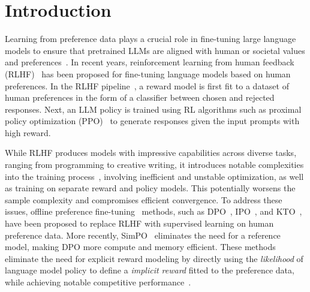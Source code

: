 \section{Introduction}
Learning from preference data plays a crucial role in fine-tuning large language models to ensure that pretrained LLMs are aligned with human or societal values and preferences~\citep{bai2022training,ouyang2022training,stiennon2020learning}. In recent years, reinforcement learning from human feedback (RLHF)~\citep{ouyang2022training,christiano2017deep} has been proposed for fine-tuning language models based on human preferences. In the RLHF pipeline~\citep{ouyang2022training}, a reward model is first fit to a dataset of human preferences in the form of a classifier between chosen and rejected responses. Next, an LLM policy is trained using RL algorithms such as proximal policy optimization (PPO)~\citep{schulman2017proximal} to generate responses given the input prompts with high reward.

While RLHF produces models with impressive capabilities across diverse tasks, ranging from programming to creative writing, it introduces notable complexities into the training process~\citep{engstrom2020implementation,rafailov2024direct}, involving inefficient and unstable optimization, as well as training on separate reward and policy models. This potentially worsens the sample complexity and compromises efficient convergence. To address these issues, offline  preference fine-tuning~\citep{tajwar2024preference} methods, such as DPO~\citep{rafailov2024direct}, IPO~\citep{azar2024general}, and KTO~\citep{DBLP:conf/icml/EthayarajhXMJK24}, have been proposed to replace RLHF with supervised learning on human preference data. More recently, SimPO~\citep{meng2024simpo} eliminates the need for a reference model, making DPO more compute and memory efficient. These methods eliminate the need for explicit reward modeling by directly using the \textit{likelihood} of language model policy to define a \textit{implicit reward} fitted to the preference data, while achieving notable competitive performance~\citep{tajwar2024preference}.


